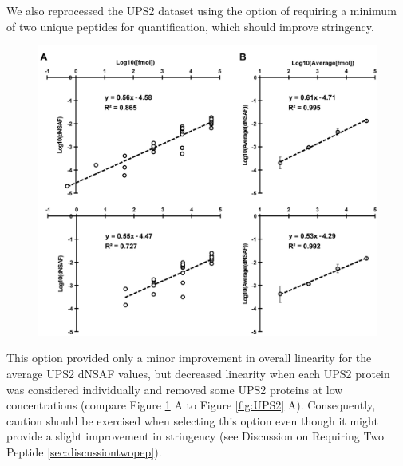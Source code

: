 We also reprocessed the UPS2 dataset using the option of requiring a minimum of two unique peptides for quantification, which should improve stringency.
\begin{figure}[p]
	\centering
	\includegraphics[width=\columnwidth]{MSpC/figure2_supplemental.png}
	\label{fig:UPS2twopep}
\end{figure}
This option provided only a minor improvement in overall linearity for the average UPS2 dNSAF values, but decreased linearity when each UPS2 protein was considered individually and removed some UPS2 proteins at low concentrations (compare Figure \ref{fig:UPS2twopep} A to Figure \ref{fig:UPS2} A).
Consequently, caution should be exercised when selecting this option even though it might provide a slight improvement in stringency (see Discussion on Requiring Two Peptide \ref{sec:discussiontwopep}).
